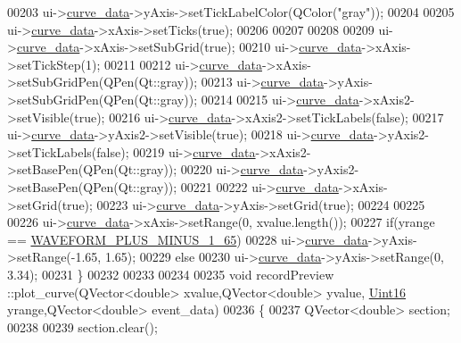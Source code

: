 \begin{DoxyCode}
00203   ui->\hyperlink{a00028_a247d94481323c0bc4f8b6458a8a535dd}{curve\_data}->yAxis->setTickLabelColor(QColor(\textcolor{stringliteral}{"gray"}));
00204 
00205   ui->\hyperlink{a00028_a247d94481323c0bc4f8b6458a8a535dd}{curve\_data}->xAxis->setTicks(\textcolor{keyword}{true});
00206 
00207 
00208 
00209   ui->\hyperlink{a00028_a247d94481323c0bc4f8b6458a8a535dd}{curve\_data}->xAxis->setSubGrid(\textcolor{keyword}{true});
00210   ui->\hyperlink{a00028_a247d94481323c0bc4f8b6458a8a535dd}{curve\_data}->xAxis->setTickStep(1);
00211 
00212   ui->\hyperlink{a00028_a247d94481323c0bc4f8b6458a8a535dd}{curve\_data}->xAxis->setSubGridPen(QPen(Qt::gray));
00213   ui->\hyperlink{a00028_a247d94481323c0bc4f8b6458a8a535dd}{curve\_data}->yAxis->setSubGridPen(QPen(Qt::gray));
00214 
00215   ui->\hyperlink{a00028_a247d94481323c0bc4f8b6458a8a535dd}{curve\_data}->xAxis2->setVisible(\textcolor{keyword}{true});
00216   ui->\hyperlink{a00028_a247d94481323c0bc4f8b6458a8a535dd}{curve\_data}->xAxis2->setTickLabels(\textcolor{keyword}{false});
00217   ui->\hyperlink{a00028_a247d94481323c0bc4f8b6458a8a535dd}{curve\_data}->yAxis2->setVisible(\textcolor{keyword}{true});
00218   ui->\hyperlink{a00028_a247d94481323c0bc4f8b6458a8a535dd}{curve\_data}->yAxis2->setTickLabels(\textcolor{keyword}{false});
00219   ui->\hyperlink{a00028_a247d94481323c0bc4f8b6458a8a535dd}{curve\_data}->xAxis2->setBasePen(QPen(Qt::gray));
00220   ui->\hyperlink{a00028_a247d94481323c0bc4f8b6458a8a535dd}{curve\_data}->yAxis2->setBasePen(QPen(Qt::gray));
00221 
00222    ui->\hyperlink{a00028_a247d94481323c0bc4f8b6458a8a535dd}{curve\_data}->xAxis->setGrid(\textcolor{keyword}{true});
00223    ui->\hyperlink{a00028_a247d94481323c0bc4f8b6458a8a535dd}{curve\_data}->yAxis->setGrid(\textcolor{keyword}{true});
00224 
00225 
00226   ui->\hyperlink{a00028_a247d94481323c0bc4f8b6458a8a535dd}{curve\_data}->xAxis->setRange(0, xvalue.length());
00227   \textcolor{keywordflow}{if}(yrange == \hyperlink{a00034_a0923d3b365a36e1e8c401cec964aa36f}{WAVEFORM\_PLUS\_MINUS\_1\_65})
00228   ui->\hyperlink{a00028_a247d94481323c0bc4f8b6458a8a535dd}{curve\_data}->yAxis->setRange(-1.65, 1.65);
00229   \textcolor{keywordflow}{else}
00230   ui->\hyperlink{a00028_a247d94481323c0bc4f8b6458a8a535dd}{curve\_data}->yAxis->setRange(0, 3.34);
00231 \}
00232 
00233 
00234 
00235 \textcolor{keywordtype}{void} recordPreview ::plot\_curve(QVector<double> xvalue,QVector<double> yvalue, 
      \hyperlink{a00001_aae7407b021d43f7193a81a58cfb3e297}{Uint16} yrange,QVector<double> event\_data)
00236 \{
00237     QVector<double> section;
00238 
00239     section.clear();

\end{DoxyCode}
